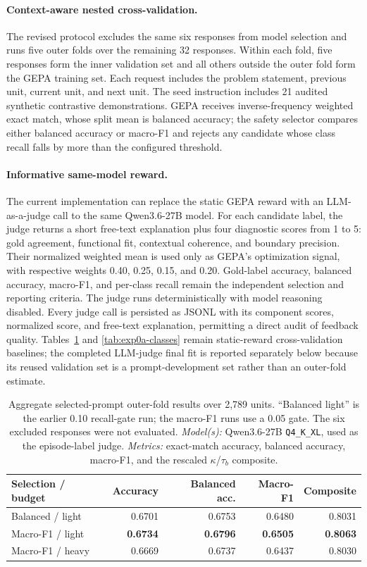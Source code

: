 \documentclass[manuscript,screen,review]{jair}
\newcommand{\modelmetrics}[2]{\textit{Model(s):} #1. \textit{Metrics:} #2.}
\begin{document}
\paragraph{Context-aware nested cross-validation.}
The revised protocol excludes the same six responses from model selection and
runs five outer folds over the remaining 32 responses.  Within each fold,
five responses form the inner validation set and all others outside the outer
fold form the GEPA training set.  Each request includes the problem statement,
previous unit, current unit, and next unit.  The seed instruction includes 21
audited synthetic contrastive demonstrations.  GEPA receives inverse-frequency
weighted exact match, whose split mean is balanced accuracy; the safety
selector compares either balanced accuracy or macro-F1 and rejects any
candidate whose class recall falls by more than the configured threshold.

\paragraph{Informative same-model reward.}
The current implementation can replace the static GEPA reward with an
LLM-as-a-judge call to the same Qwen3.6-27B model.  For each candidate label,
the judge returns a short free-text explanation plus four diagnostic scores
from 1 to 5: gold agreement, functional fit, contextual coherence, and boundary
precision.  Their normalized weighted mean is used only as GEPA's optimization
signal, with respective weights 0.40, 0.25, 0.15, and 0.20.  Gold-label
accuracy, balanced accuracy, macro-F1, and per-class recall remain the
independent selection and reporting criteria.  The judge runs deterministically
with model reasoning disabled.  Every judge call is persisted as JSONL with
its component scores, normalized score, and free-text explanation, permitting
a direct audit of feedback quality.  Tables~\ref{tab:exp0a-cv} and
\ref{tab:exp0a-classes} remain static-reward cross-validation baselines; the
completed LLM-judge final fit is reported separately below because its reused
validation set is a prompt-development set rather than an outer-fold estimate.

\begin{table}[t]
\centering
\caption{Aggregate selected-prompt outer-fold results over 2,789 units.
``Balanced light'' is the earlier 0.10 recall-gate run; the macro-F1 runs use a
0.05 gate.  The six excluded responses were not evaluated.
\modelmetrics{Qwen3.6-27B \texttt{Q4\_K\_XL}, used as the episode-label
judge}{exact-match accuracy, balanced accuracy, macro-F1, and the rescaled
$\kappa$/$\tau_b$ composite}}
\label{tab:exp0a-cv}
\begin{tabular}{lrrrr}
\toprule
Selection / budget & Accuracy & Balanced acc. & Macro-F1 & Composite \\
\midrule
Balanced / light & 0.6701 & 0.6753 & 0.6480 & 0.8031 \\
Macro-F1 / light & \textbf{0.6734} & \textbf{0.6796} &
\textbf{0.6505} & \textbf{0.8063} \\
Macro-F1 / heavy & 0.6669 & 0.6737 & 0.6437 & 0.8030 \\
\bottomrule
\end{tabular}
\end{table}
\end{document}

